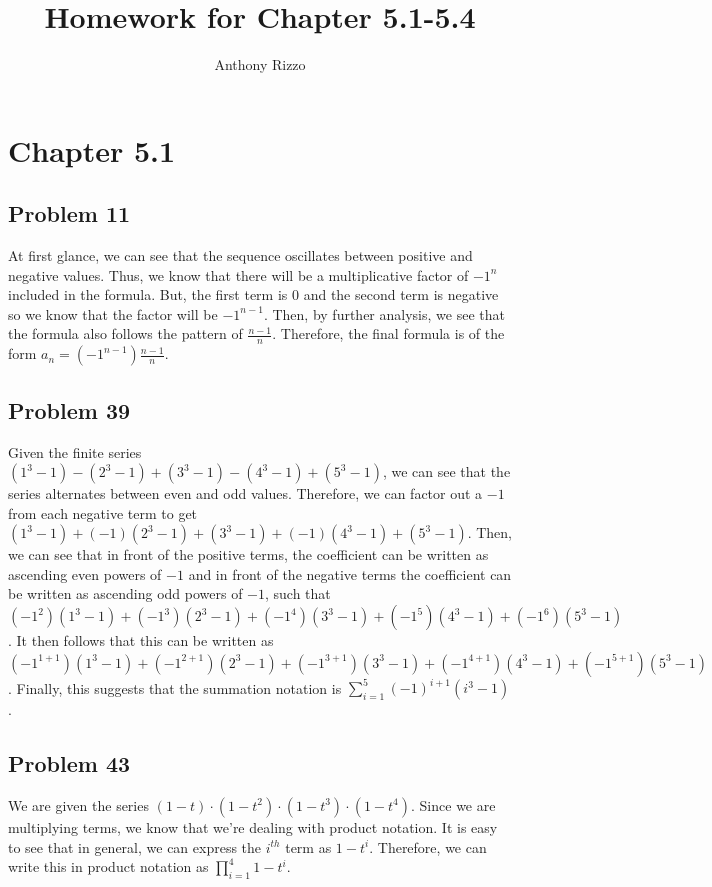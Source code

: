 \documentclass{article}
\title{Homework for Chapter 5.1-5.4}
\author{Anthony Rizzo}
\begin{document}
\maketitle


\section*{Chapter 5.1}

\subsection*{Problem 11}

At first glance, we can see that the sequence oscillates between positive and negative values. Thus, we know that there will be a multiplicative factor of $-1^n$ included in the formula. But, the first term is $0$ and the second term is negative so we know that the factor will be $-1^{n-1}$. Then, by further analysis,
we see that the formula also follows the pattern of $\frac{n-1}{n}$. Therefore, the final formula is of the form $a_n = (-1^{n-1}) \frac{n-1}{n}$.

\subsection*{Problem 39}

Given the finite series $(1^3-1)-(2^3-1)+(3^3-1)-(4^3-1)+(5^3-1)$, we can see that the series alternates between even and odd values. Therefore, we can factor out a $-1$ from each negative term to get $(1^3-1)+(-1)(2^3-1)+(3^3-1)+(-1)(4^3-1)+(5^3-1)$. Then, we can see that in front of the positive terms, the coefficient can be written as ascending even powers of $-1$ and in front of the negative terms the coefficient can be written as ascending odd powers of $-1$, such that $(-1^{2}) (1^3-1)+(-1^{3})(2^3-1)+(-1^{4})(3^3-1)+(-1^{5})(4^3-1)+(-1^{6})(5^3-1)$. It then follows that this can be written as $(-1^{1+1}) (1^3-1)+(-1^{2+1})(2^3-1)+(-1^{3+1})(3^3-1)+(-1^{4+1})(4^3-1)+(-1^{5+1})(5^3-1)$. Finally, this suggests that the summation notation is $\sum\limits_{i=1}^5 (-1)^{i+1}(i^{3}-1)$.

\subsection*{Problem 43}

We are given the series $(1-t)\cdot(1-t^2)\cdot(1-t^3)\cdot(1-t^4)$. Since we are multiplying terms, we know that we're dealing with product notation. It is easy to see that in general, we can express the $i^{th}$ term as $1-t^i$. Therefore, we can write this in product notation as $\prod\limits_{i=1}^4 1-t^i$.
\end{document}
